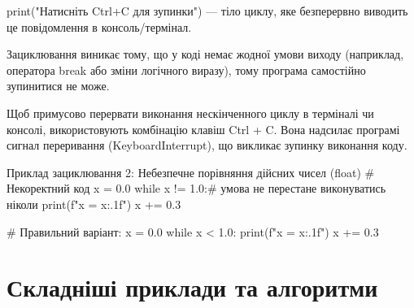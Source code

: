 print("Натисніть Ctrl+C для зупинки") — тіло циклу, яке безперервно виводить це повідомлення в консоль/термінал.

Зациклювання виникає тому, що у коді немає жодної умови виходу (наприклад, оператора break або зміни логічного виразу), тому програма самостійно зупинитися не може.

Щоб примусово перервати виконання нескінченного циклу в терміналі чи консолі, використовують комбінацію клавіш Ctrl + C. Вона надсилає програмі сигнал переривання (KeyboardInterrupt), що викликає зупинку виконання коду.
\begin{py}{Приклад зациклювання 2: Небезпечне порівняння дійсних чисел (float)}
# Некоректний код 
x = 0.0
while x != 1.0:# умова не перестане виконуватись ніколи
    print(f"x = {x:.1f}")
    x += 0.3

# Правильний варіант:
x = 0.0
while x < 1.0:
    print(f"x = {x:.1f}")
    x += 0.3
\end{py}

\section{Складніші приклади та алгоритми}

